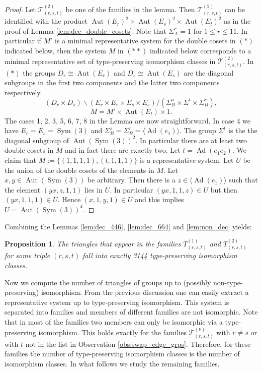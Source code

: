 \documentclass[dvipsnames]{article}
\newtheorem{proposition}[theorem]{Proposition}
\theoremstyle{definition}
\theoremstyle{remark}
\DeclareMathOperator{\Sym}{Sym}
\DeclareMathOperator{\Aut}{Aut}
\DeclareMathOperator{\Ad}{Ad}
\begin{document}
    \begin{proof}
        Let $\mathcal T_{(r,s,t)}^{(2)}$ be one of the families in the lemma. Then $\mathcal T_{(r,s,t)}^{(2)}$ can be identified with the product
        $\Aut(E_r)^2 \times \Aut(E_s)^2 \times \Aut(E_t)^2$ as in the proof of Lemma \ref{lem:dec_double_cosets}. Note that $\Sigma_A^r = 1$ for $1\leq r \leq 11$. In particular if $M'$ is a minimal representative system for the double cosets in $(*)$ indicated below, then the system $M$ in $(**)$ indicated below corresponds to a minimal representative set of type-preserving isomorphism classes in $\mathcal T_{(r,s,t)}^{(2)}$. In $(*)$ the groups $D_r \cong \Aut(E_r)$ and $D_s \cong \Aut(E_s)$ are the diagonal subgroups in the first two components and the latter two components respectively.
        \[
            (D_r \times D_s)
            \backslash
            (E_r \times E_r \times E_s \times E_s)
            /
            (\Sigma_B^a \times \Sigma^t \times \Sigma_B^r), \tag{$*$}
        \]
        \[
            M = M' \times \Aut(E_t) \times 1. \tag{$**$}
        \]
        The cases 1, 2, 3, 5, 6, 7, 8 in the Lemma are now straightforward. In case 4 we have $E_r=E_s=\Sym(3)$ and $\Sigma_B^s = \Sigma_B^r = \langle \Ad(e_1)\rangle$. The group $\Sigma^t$ is the the diagonal subgroup of $\Aut(\Sym(3))^2$. In particular there are at least two double cosets in $M$ and in fact there are exactly two. Let $t = \Ad(e_1e_2)$. We claim that $M := \{(1,1,1,1), (t,1,1,1)\}$ is a representative system. 
        Let $U$ be the union of the double cosets of the elements in $M$.
        Let $x,y \in \Aut(\Sym(3))$ be arbitrary. Then there is a $z \in \langle \Ad(e_1)\rangle$ such that the element $(yx, z, 1, 1)$ lies in $U$. In particular $(yx,1,1,z) \in U$ but then $(yx,1,1,1) \in U$. Hence $(x,1,y,1)\in U$ and this implies $U=\Aut(\Sym(3))^4$.
    \end{proof}

    Combining the Lemmas \ref{lem:dec_446}, \ref{lem:dec_664} and \ref{lem:non_dec} yields:

    \begin{proposition}
        The triangles that appear in the families $T_{(r,s,t)}^{(1)}$ and $T_{(r,s,t)}^{(2)}$ for some triple $(r,s,t)$ fall into exactly 3144 type-preserving isomorphism classes.
    \end{proposition}

    Now we compute the number of triangles of groups up to (possibly non-type-preserving) isomorphism. From the previous discussion one can easily extract a representative system up to type-preserving isomorphism. This system is separated into families and members of different families are not isomorphic. Note that in most of the families two members can only be isomorphic via a type-preserving isomorphism. This holds exactly for the families $\mathcal T_{(r,s,t)}^{(\nu)}$ with $r\neq s$ or with $t$ not in the list in Observation \ref{obs:swap_edge_grps}. Therefore, for these families the number of type-preserving isomorphism classes is the number of isomorphism classes. In what follows we study the remaining families.
\end{document}
